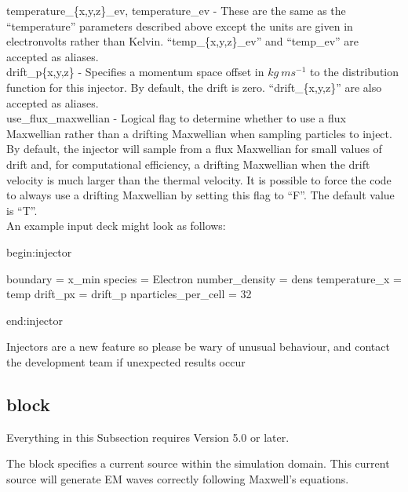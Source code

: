 {\emphtext temperature\_\{x,y,z\}\_ev, temperature\_ev} - These are the same
  as the ``temperature'' parameters described above except the units are given
  in electronvolts rather than Kelvin. ``temp\_\{x,y,z\}\_ev'' and ``temp\_ev''
  are accepted as aliases.\\

{\emphtext drift\_p\{x,y,z\}} - Specifies a momentum space offset in
  $kg\ ms^{-1}$ to the distribution function for this injector. By default,
  the drift is zero. ``drift\_\{x,y,z\}'' are also accepted as aliases.\\

{\emphtext use\_flux\_maxwellian} - Logical flag to determine whether to use
  a flux Maxwellian rather than a drifting Maxwellian when sampling particles
  to inject. By default, the injector will sample from a flux Maxwellian for
  small values of drift and, for computational efficiency, a drifting
  Maxwellian when the drift velocity is much larger than the thermal velocity.
  It is possible to force the code to always use a drifting Maxwellian by
  setting this flag to ``F''.  The default value is ``T''.\\

An example input deck might look as follows:\\

\begin{boxverbatim}
begin:injector

  boundary = x_min
  species = Electron
  number_density = dens
  temperature_x = temp
  drift_px = drift_p
  nparticles_per_cell = 32

end:injector
\end{boxverbatim}

{\emphtext
Injectors are a new feature so please be wary of unusual behaviour, and
contact the {\EPOCH} development team if unexpected results occur}

\subsection{\texorpdfstring
  { block}
  {           {antenna} block}}
\label{sec:antenna_block}

{\emphtext
Everything in this Subsection requires {\EPOCH} Version 5.0 or later.}

The  block specifies a current source within the simulation
domain. This current source will generate EM waves correctly following Maxwell's
equations.

